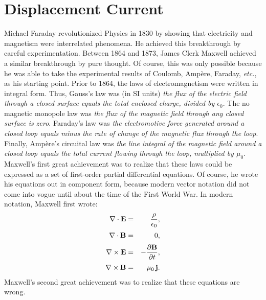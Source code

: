 \section{Displacement Current}
Michael Faraday revolutionized Physics in 1830 by showing that electricity
and magnetism were interrelated phenomena. He achieved this breakthrough 
by careful experimentation. Between 1864 and 1873, James Clerk Maxwell achieved
a similar breakthrough by pure thought. Of course, this was only possible
because he was able to take the experimental results of Coulomb, Amp\`{e}re, Faraday, {\em etc.},
as his starting point. Prior to 1864, the laws of electromagnetism were written
in integral form. Thus, Gauss's law was (in SI units) {\em the flux of
the electric  field through a closed surface equals the total enclosed charge,
divided by $\epsilon_0$}. The no magnetic monopole law was {\em the flux of the
magnetic field through any closed surface is zero}. Faraday's law was
{\em the electromotive force generated around a closed loop equals minus the
rate of change of the magnetic flux through the loop}. Finally, Amp\`{e}re's
circuital
law was {\em the line integral of the magnetic field around a closed loop equals
the total current flowing through the loop, multiplied by $\mu_0$}. Maxwell's first
great achievement 
was to realize that these laws could be expressed as a set of first-order partial
differential equations. Of course, he wrote his equations
 out in component form, because
modern vector notation did not come into vogue until about the time of the
First World War. In modern notation, Maxwell first wrote:
\begin{eqnarray}\label{e4.28}
\nabla\cdot{\bf E} &=& \frac{\rho}{\epsilon_0}, \\[0.5ex]
\nabla\cdot{\bf B} &=& 0, \\[0.5ex]
\nabla\times{\bf E} &=& - \frac{\partial {\bf B}}{\partial t} , \\[0.5ex]
\nabla\times{\bf B} &=& \mu_0 \,{\bf j}.\label{e4.31}
\end{eqnarray}
Maxwell's second great achievement was to realize that these equations are wrong. 

